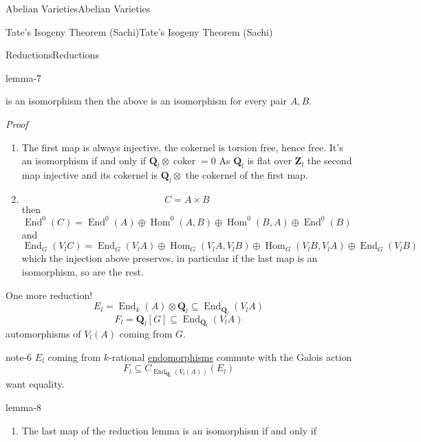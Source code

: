 \documentclass[10pt,]{book}
\makeatletter
\renewcommand*{\proofname}{Proof}
\renewenvironment{proof}[1][\proofname]{\par
  \pushQED{\qed}%
  \normalfont \topsep6\p@\@plus6\p@\relax
  \trivlist
  \item\relax
    {\itshape
    #1\@addpunct{.}}\hspace\labelsep\ignorespaces
}{%
  \popQED\endtrivlist\@endpefalse
}
\numberwithin{equation}{section}
\newcommand{\ZZ}{\mathbf{Z}}
\newcommand{\QQ}{\mathbf{Q}}
\DeclareMathOperator{\coker}{coker}
\DeclareMathOperator{\End}{End}
\DeclareMathOperator{\Hom}{Hom}
\makeatother
\begin{document}
\begin{chapterptx}{Abelian Varieties}{}{Abelian Varieties}{}{}
\begin{sectionptx}{Tate's Isogeny Theorem (Sachi)}{}{Tate's Isogeny Theorem (Sachi)}{}{}
\begin{subsectionptx}{Reductions}{}{Reductions}{}{}
\begin{lemma}{}{}{lemma-7}
\begin{enumerate}
is an isomorphism then the above is an isomorphism for every pair \(A,B\).%
\end{enumerate}
%
\end{lemma}
\begin{proof}\hypertarget{proof-65}{}
\hypertarget{p-386}{}%
\leavevmode%
\begin{enumerate}
\item\hypertarget{li-75}{}The first map is always injective, the cokernel is torsion free, hence free. It's an isomorphism if and only if \(\QQ_l \otimes \coker = 0\) As \(\QQ_l\) is flat over \(\ZZ_l\) the second map injective and its cokernel is \(\QQ_l \otimes\) the cokernel of the first map.%
\item\hypertarget{li-76}{}%
\begin{equation*}
C = A\times B
\end{equation*}
then%
\begin{equation*}
\End^0(C) = \End^0(A)\oplus \Hom^0(A,B) \oplus \Hom^0(B,A) \oplus \End^0(B)
\end{equation*}
and%
\begin{equation*}
\End_G(V_lC) = \End_G(V_lA)\oplus \Hom_G(V_lA,V_lB) \oplus \Hom_G(V_lB,V_lA) \oplus \End_G(V_lB)
\end{equation*}
which the injection above preserves, in  particular if the last map is an isomorphism, so are the rest.%
\end{enumerate}
%
\end{proof}
\hypertarget{p-387}{}%
One more reduction!%
\begin{equation*}
E_l = \End_k(A) \otimes \QQ_l\subseteq \End_{\QQ_l} (V_lA)
\end{equation*}
%
\begin{equation*}
F_l = \QQ_l[G] \subseteq \End_{\QQ_l} (V_lA)
\end{equation*}
automorphisms of \(V_l(A) \) coming from \(G\).%
\begin{note}{}{note-6}%
\hypertarget{p-388}{}%
\(E_l\) coming from \(k\)-rational \hyperref[def-supersing-isog-endo]{endomorphisms} commute with the Galois action%
\begin{equation*}
F_l\subseteq C_{\End_{\QQ_l}(V_l(A))}(E_l)
\end{equation*}
want equality.%
\end{note}
\begin{lemma}{}{}{lemma-8}%
\hypertarget{p-389}{}%
\leavevmode%
\begin{enumerate}
\item\hypertarget{li-77}{}The last map of the reduction lemma is an isomorphism if and only if%

\end{enumerate}
\end{lemma}
\end{subsectionptx}
\end{sectionptx}
\end{chapterptx}
\end{document}
